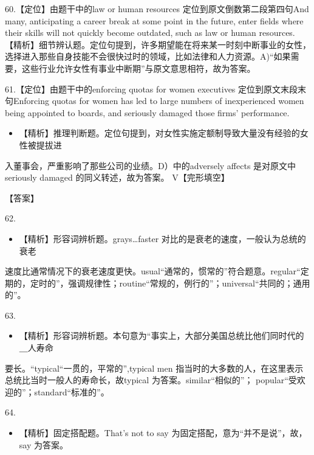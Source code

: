 \documentclass[UTF8,11pt]{ctexart}
\begin{document}
60.【定位】由题干中的law or human resources 定位到原文倒数第二段第四句And many, anticipating a career break at some point in the future, enter fields where their skills will not quickly become outdated, such as law or human resources. 【精析】细节辨认题。定位句提到，许多期望能在将来某一时刻中断事业的女性，选择进入那些自身技能不会很快过时的领域，比如法律和人力资源。A)“如果需要，这些行业允许女性有事业中断期”与原文意思相符，故为答案。


61.【定位】由题干中的enforcing quotas for women executives 定位到原文末段末句Enforcing quotas for women has led to large numbers of inexperienced women being appointed to boards, and seriously damaged those firms' performance.


\begin{itemize}[leftmargin=2em,itemsep=.2em,topsep=.4em]\item[D.] 【精析】推理判断题。定位句提到，对女性实施定额制导致大量没有经验的女性被提拔进
\end{itemize}

入董事会，严重影响了那些公司的业绩。D）中的adversely affects 是对原文中seriously damaged 的同义转述，故为答案。 V【完形填空】


【答案】


62.


\begin{itemize}[leftmargin=2em,itemsep=.2em,topsep=.4em]\item[A.] 【精析】形容词辨析题。grays…faster 对比的是衰老的速度，一般认为总统的衰老
\end{itemize}

速度比通常情况下的衰老速度更快。usual“通常的，惯常的”符合题意。regular“定期的，定时的”，强调规律性；routine“常规的，例行的”；universal“共同的；通用的”。


63.


\begin{itemize}[leftmargin=2em,itemsep=.2em,topsep=.4em]\item[C.] 【精析】形容词辨析题。本句意为“事实上，大部分美国总统比他们同时代的＿人寿命
\end{itemize}

要长。“typical“一贯的，平常的”,typical men 指当时的大多数的人，在这里表示总统比当时一般人的寿命长，故typical 为答案。similar“相似的”； popular“受欢迎的”；standard“标准的”。


64.


\begin{itemize}[leftmargin=2em,itemsep=.2em,topsep=.4em]\item[B.] 【精析】固定搭配题。That's not to say 为固定搭配，意为“并不是说”，故，say 为答案。
\end{itemize}
\end{document}
